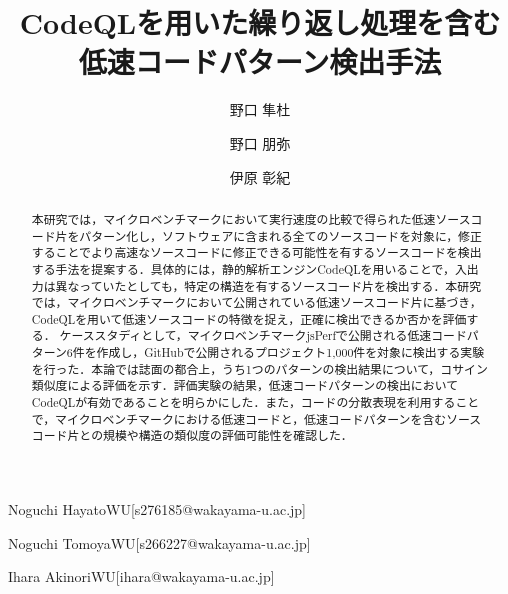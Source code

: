 \documentclass[submit,techrep,noauthor]{ipsj}
\newcommand{\todo}[1]{\colorbox{yellow}{{\bf TODO}:}{\color{red} {\textbf{[#1]}}}}
\begin{document}
\title{CodeQLを用いた繰り返し処理を含む
\\
低速コードパターン検出手法
}


\author{野口 隼杜}{Noguchi Hayato}{WU}[s276185@wakayama-u.ac.jp]
\author{野口 朋弥}{Noguchi Tomoya}{WU}[s266227@wakayama-u.ac.jp]
\author{伊原 彰紀}{Ihara Akinori}{WU}[ihara@wakayama-u.ac.jp]

\begin{abstract}
本研究では，マイクロベンチマークにおいて実行速度の比較で得られた低速ソースコード片をパターン化し，ソフトウェアに含まれる全てのソースコードを対象に，修正することでより高速なソースコードに修正できる可能性を有するソースコードを検出する手法を提案する．具体的には，静的解析エンジンCodeQLを用いることで，入出力は異なっていたとしても，特定の構造を有するソースコード片を検出する．本研究では，マイクロベンチマークにおいて公開されている低速ソースコード片に基づき，CodeQLを用いて低速ソースコードの特徴を捉え，正確に検出できるか否かを評価する．
ケーススタディとして，マイクロベンチマークjsPerfで公開される低速コードパターン6件を作成し，GitHubで公開されるプロジェクト1,000件を対象に検出する実験を行った．本論では誌面の都合上，うち1つのパターンの検出結果について，コサイン類似度による評価を示す．評価実験の結果，低速コードパターンの検出においてCodeQLが有効であることを明らかにした．また，コードの分散表現を利用することで，マイクロベンチマークにおける低速コードと，低速コードパターンを含むソースコード片との規模や構造の類似度の評価可能性を確認した．


\end{abstract}
\end{document}
